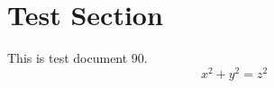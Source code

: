 \documentclass{article}
\begin{document}
\section{Test Section}
This is test document 90.
\begin{equation}
x^2 + y^2 = z^2
\end{equation}
\end{document}
